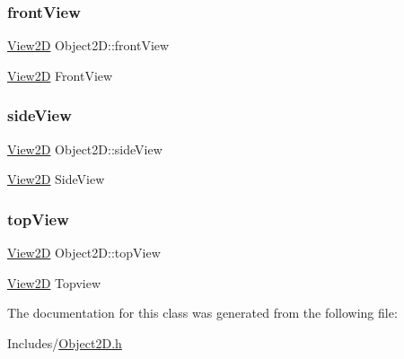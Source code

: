 \subsubsection{\texorpdfstring{front\+View}{frontView}}
{\footnotesize\ttfamily \mbox{\hyperlink{class_view2_d}{View2D}} Object2\+D\+::front\+View}

\mbox{\hyperlink{class_view2_d}{View2D}} Front\+View \mbox{\label{class_object2_d_a2a37b1a8f9b5968c92b22c2c2c7bb2d4}} 
\subsubsection{\texorpdfstring{side\+View}{sideView}}
{\footnotesize\ttfamily \mbox{\hyperlink{class_view2_d}{View2D}} Object2\+D\+::side\+View}

\mbox{\hyperlink{class_view2_d}{View2D}} Side\+View \mbox{\label{class_object2_d_adadaec6529bf5ea273f559e6e068486b}} 
\subsubsection{\texorpdfstring{top\+View}{topView}}
{\footnotesize\ttfamily \mbox{\hyperlink{class_view2_d}{View2D}} Object2\+D\+::top\+View}

\mbox{\hyperlink{class_view2_d}{View2D}} Topview 

The documentation for this class was generated from the following file\+:\begin{DoxyCompactItemize}
\item 
Includes/\mbox{\hyperlink{_object2_d_8h}{Object2\+D.\+h}}\end{DoxyCompactItemize}
